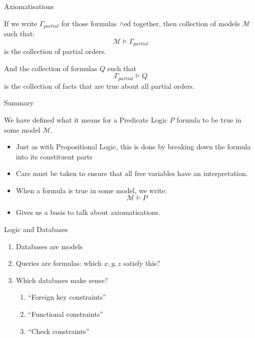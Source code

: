 \documentclass[xetex,aspectratio=169,14pt,hyperref={pdfpagelabels=true,pdflang={en-GB}}]{beamer}
\begin{document}
\begin{frame}
  {Axiomatisations}

  If we write $\Gamma_{\mathit{partial}}$ for those formulas $\land$ed
  together, then collection of models $\mathcal{M}$ such that:
  \begin{displaymath}
    \mathcal{M} \models \Gamma_{\mathit{partial}}
  \end{displaymath}
  is the collection of partial orders.

  \bigskip

  And the collection of formulas $Q$ such that
  \begin{displaymath}
    \Gamma_{\mathit{partial}} \models Q
  \end{displaymath}
  is the collection of facts that are true about all partial orders.
\end{frame}

\begin{frame}
  {Summary}

  We have defined what it means for a Predicate Logic $P$ formula to
  be true in some model $\mathcal{M}$.

  \begin{itemize}
  \item Just as with Propositional Logic, this is done by breaking
    down the formula into its constituent parts
  \item Care must be taken to ensure that all free variables have an
    interpretation.
  \item When a formula is true in some model, we write:
    \begin{displaymath}
      \mathcal{M} \models P
    \end{displaymath}
  \item Gives us a basis to talk about axiomatisations.
  \end{itemize}
\end{frame}


\begin{frame}
  {Logic and Databases}

  \begin{enumerate}
  \item Databases are models
  \item Queries are formulas: which $x,y,z$ satisfy this?
  \item Which databases make sense?
    \begin{enumerate}
    \item ``Foreign key constraints''
    \item ``Functional constraints''
    \item ``Check constraints''
    \end{enumerate}
  \end{enumerate}
\end{frame}
\end{document}
